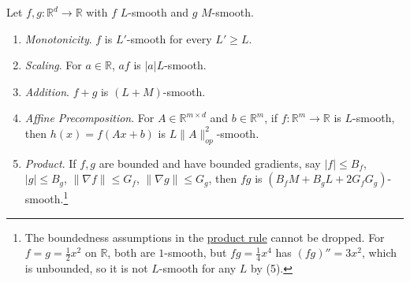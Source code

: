 	\begin{lemma}
	  \label{thm:properties-of-l-smoothness}
		Let $f, g: \mathbb{R}^d \to \mathbb{R}$ with $f$ $L$-smooth and $g$ $M$-smooth. 
		\begin{enumerate}
		  \item \textit{Monotonicity}. $f$ is $L'$-smooth for every $L' \geq L$. 
			\item \textit{Scaling}. For $a \in \mathbb{R}$, $af$ is $|a|L$-smooth. 
			\item \textit{Addition}. $f + g$ is $(L + M)$-smooth.
			\item \textit{Affine Precomposition}. For $A \in \mathbb{R}^{m \times d}$ and $b \in \mathbb{R}^m$, if $f: \mathbb{R}^m \to \mathbb{R}$ is $L$-smooth, then $h(x) = f(Ax + b)$ is $L\|A\|_{op}^2$-smooth. 
			\item \textit{Product}. If $f, g$ are bounded and have bounded gradients, say $|f| \leq B_f$, $|g| \leq B_g$, $\|\nabla f\| \leq G_f$, $\|\nabla g\| \leq G_g$, then $fg$ is $(B_f M + B_g L + 2 G_f G_g)$-smooth.\footnote{The boundedness assumptions in the \hyperref[mv-thm:product-rule-2]{product rule} cannot be dropped. For $f = g = \frac{1}{2}x^2$ on $\mathbb{R}$, both are $1$-smooth, but $fg = \frac{1}{4}x^4$ has $(fg)'' = 3x^2$, which is unbounded, so it is not $L$-smooth for any $L$ by (5).}
		\end{enumerate}
	\end{lemma}
